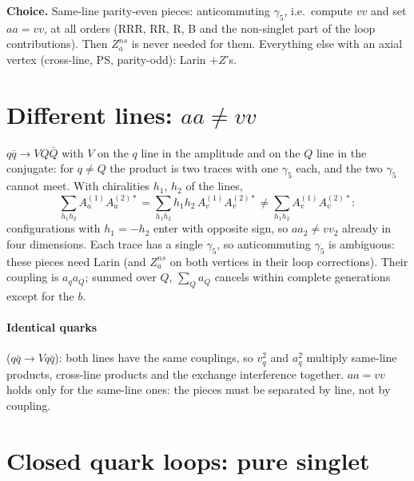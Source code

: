 \documentclass[11pt,a4paper]{article}
\newcommand{\gf}{\gamma_5}
\newcommand{\note}[1]{\par\smallskip\noindent\colorbox{gray!12}{\parbox{\dimexpr\linewidth-2\fboxsep}{\small #1}}\par\smallskip}
\begin{document}
\note{\textbf{Choice.} Same-line parity-even pieces: anticommuting $\gf$, i.e.\ compute $vv$ and set $aa=vv$, at all
orders (RRR, RR, R, B and the non-singlet part of the loop contributions). Then $Z_a^{ns}$ is never needed for them.
Everything else with an axial vertex (cross-line, PS, parity-odd): Larin $+Z$'s.}

\section{Different lines: \texorpdfstring{$aa\neq vv$}{aa != vv}}\label{sec:cross}

$q\bar q\to VQ\bar Q$ with $V$ on the $q$ line in the amplitude and on the $Q$ line in the conjugate: for $q\neq Q$ the
product is two traces with one $\gf$ each, and the two $\gf$ cannot meet. With chiralities $h_1$, $h_2$ of the lines,
\begin{equation}
\sum_{h_1h_2}A_a^{(1)}A_a^{(2)*}=\sum_{h_1h_2}h_1h_2\,A_v^{(1)}A_v^{(2)*}\neq\sum_{h_1h_2}A_v^{(1)}A_v^{(2)*}:
\end{equation}
configurations with $h_1=-h_2$ enter with opposite sign, so $aa_2\neq vv_2$ already in four dimensions. Each trace has a
single $\gf$, so anticommuting $\gf$ is ambiguous: these pieces need Larin (and $Z_a^{ns}$ on both vertices in their
loop corrections). Their coupling is $a_qa_Q$; summed over $Q$, $\sum_Qa_Q$ cancels within complete generations
except for the $b$.

\paragraph{Identical quarks} ($q\bar q\to Vq\bar q$): both lines have the same couplings, so $v_q^2$ and $a_q^2$
multiply same-line products, cross-line products and the exchange interference together. $aa=vv$ holds only for the
same-line ones: the pieces must be separated by line, not by coupling.

\section{Closed quark loops: pure singlet}\label{sec:ps}
\end{document}
